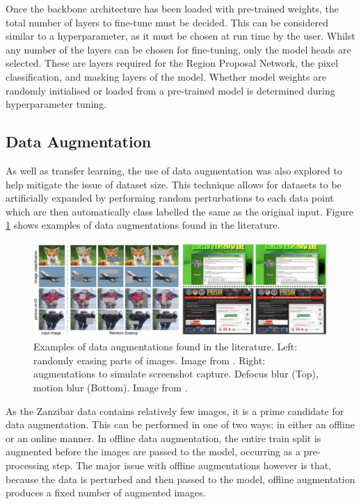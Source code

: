 Once the backbone architecture has been loaded with pre-trained weights, the total number of layers to fine-tune must be decided. This can be considered similar to a hyperparameter, as it must be chosen at run time by the user. Whilst any number of the layers can be chosen for fine-tuning, only the model heads are selected. These are layers required for the Region Proposal Network, the pixel classification, and masking layers of the model. Whether model weights are randomly initialised or loaded from a pre-trained model is determined during hyperparameter tuning.

\subsection{Data Augmentation}\label{ch:cetDet,sec:initialTesting,sub:dataaugmentation}

As well as transfer learning, the use of data augmentation was also explored to help mitigate the issue of dataset size. This technique allows for datasets to be artificially expanded by performing random perturbations to each data point which are then automatically class labelled the same as the original input. Figure \ref{fig:data-aug-examples} shows examples of data augmentations found in the literature.

\begin{figure}[h]
	\begin{center}
		\includegraphics[scale=0.45]{Chapter4/figs/data-augs.png}
	\end{center}
	\caption[Examples of data augmentations found in the literature.]{Examples of data augmentations found in the literature. Left: randomly erasing parts of images. Image from \cite{zhong_random_2017}. Right: augmentations to simulate screenshot capture. Defocus blur (Top), motion blur (Bottom). Image from \cite{atapour-abarghouei_kings_2019}.}
	\label{fig:data-aug-examples}
\end{figure}

As the Zanzibar data contains relatively few images, it is a prime candidate for data augmentation. This can be performed in one of two ways; in either an offline or an online manner. In offline data augmentation, the entire train split is augmented before the images are passed to the model, occurring as a pre-processing step. The major issue with offline augmentations however is that, because the data is perturbed and then passed to the model, offline augmentation produces a fixed number of augmented images. 

